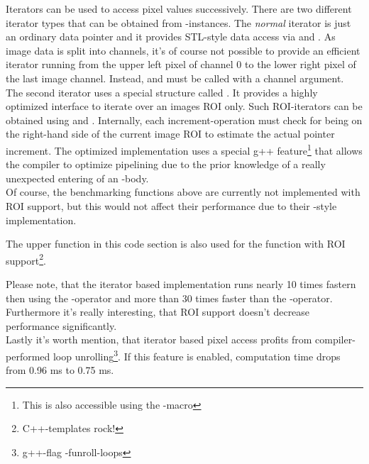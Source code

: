 Iterators can be used to access pixel values successively. There are two different iterator types that can be obtained from -instances. The \emph{normal} iterator is just an ordinary data pointer and it provides STL-style data access via   and . As image data is split into channels, it's of course not possible to provide an efficient iterator running from the upper left pixel of channel $0$ to the lower right pixel of the last image channel. Instead,  and  must be called with a channel argument.\\
The second iterator uses a special structure called  . It provides a highly optimized interface to iterate over an images ROI only. Such ROI-iterators can be obtained using  and . Internally, each increment-operation must check for being on the right-hand side of the current image ROI to estimate the actual pointer increment. The optimized implementation uses a special g++ feature\footnote{This is also accessible using the -macro } that allows the compiler to optimize pipelining due to the prior knowledge of a really unexpected entering of an -body.\\
Of course, the benchmarking functions above are currently not implemented with ROI support, but this would not affect their performance due to their -style implementation. 


The upper function in this code section is also used for the function with ROI support\footnote{C++-templates rock!}.


Please note, that the iterator based implementation runs nearly 10 times fastern then using the -operator and more than 30 times faster than the -operator. Furthermore it's really interesting, that ROI support doesn't decrease performance significantly.\\
Lastly it's worth mention, that iterator based pixel access profits from compiler-performed loop unrolling\footnote{g++-flag -funroll-loops}. If this feature is enabled, computation time drops from 0.96 ms to 0.75 ms.

